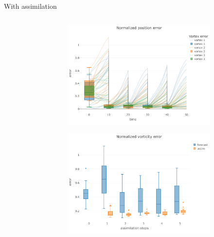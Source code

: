 \documentclass[aspectratio=169]{beamer} %
\begin{document}
\begin{frame}{With assimilation}
    \begin{columns}
        \begin{column}{0.5\textwidth}
            \begin{figure}
                \centering
            \end{figure}
        \end{column}
        \begin{column}{0.5\textwidth}
            \begin{figure}
                \centering
                \begin{subfigure}{\textwidth}
                    \centering
                    \includegraphics[width=\textwidth]{images/error_position_w_assim.pdf}
                \end{subfigure}
                \begin{subfigure}{\textwidth}
                    \centering
                    \includegraphics[width=\textwidth]{images/error_vorticity_w_assim.pdf}

\end{subfigure}
\end{figure}
\end{column}
\end{columns}
\end{frame}
\end{document}
